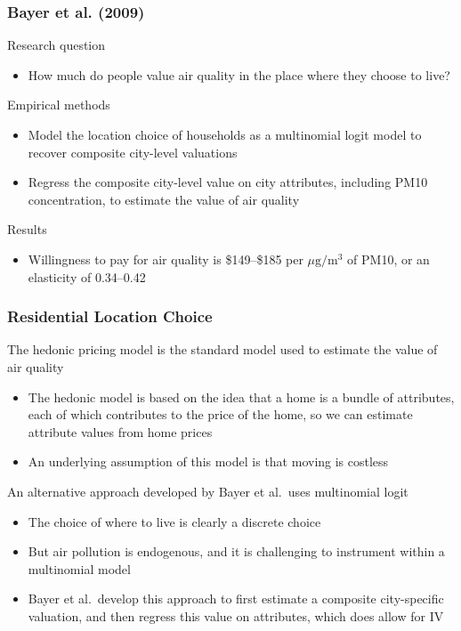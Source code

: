 \documentclass{beamer}
\begin{document}
\begin{frame}\frametitle{Bayer et al. (2009)}
    Research question
    \begin{itemize}
        \item How much do people value air quality in the place where they choose to live?
    \end{itemize}
    \vspace{2ex}
    Empirical methods
    \begin{itemize}
      \item Model the location choice of households as a multinomial logit model to recover composite city-level valuations
      \item Regress the composite city-level value on city attributes, including PM10 concentration, to estimate the value of air quality
    \end{itemize}
    \vspace{2ex}
    Results
    \begin{itemize}
      \item Willingness to pay for air quality is \$149--\$185 per $\mu \text{g} / \text{m}^3$ of PM10, or an elasticity of 0.34--0.42
    \end{itemize}
\end{frame}

\begin{frame}\frametitle{Residential Location Choice}
    The hedonic pricing model is the standard model used to estimate the value of air quality
    \begin{itemize}
      \item The hedonic model is based on the idea that a home is a bundle of attributes, each of which contributes to the price of the home, so we can estimate attribute values from home prices
      \item An underlying assumption of this model is that moving is costless
    \end{itemize}
    \vspace{2ex}
    An alternative approach developed by Bayer et al.\ uses multinomial logit
    \begin{itemize}
      \item The choice of where to live is clearly a discrete choice
      \item But air pollution is endogenous, and it is challenging to instrument within a multinomial model
      \item Bayer et al.\ develop this approach to first estimate a composite city-specific valuation, and then regress this value on attributes, which does allow for IV
    \end{itemize}
\end{frame}
\end{document}
